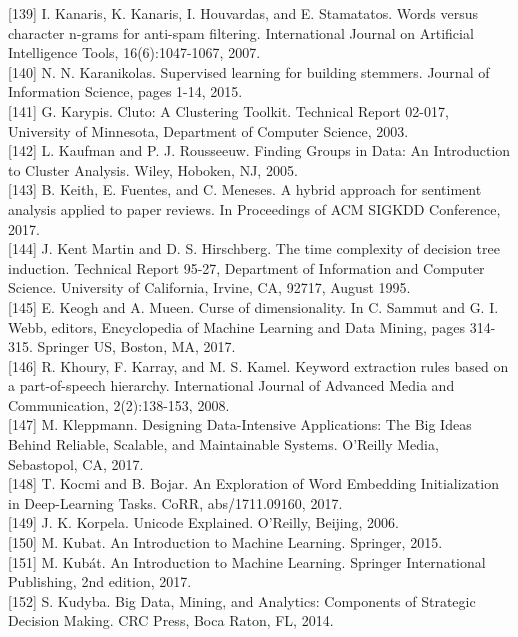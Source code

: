 \documentclass[10pt]{book}
\begin{document}
[139] I. Kanaris, K. Kanaris, I. Houvardas, and E. Stamatatos. Words versus character n-grams for anti-spam filtering. International Journal on Artificial Intelligence Tools, 16(6):1047-1067, 2007.\\[0pt]
[140] N. N. Karanikolas. Supervised learning for building stemmers. Journal of Information Science, pages 1-14, 2015.\\[0pt]
[141] G. Karypis. Cluto: A Clustering Toolkit. Technical Report 02-017, University of Minnesota, Department of Computer Science, 2003.\\[0pt]
[142] L. Kaufman and P. J. Rousseeuw. Finding Groups in Data: An Introduction to Cluster Analysis. Wiley, Hoboken, NJ, 2005.\\[0pt]
[143] B. Keith, E. Fuentes, and C. Meneses. A hybrid approach for sentiment analysis applied to paper reviews. In Proceedings of ACM SIGKDD Conference, 2017.\\[0pt]
[144] J. Kent Martin and D. S. Hirschberg. The time complexity of decision tree induction. Technical Report 95-27, Department of Information and Computer Science. University of California, Irvine, CA, 92717, August 1995.\\[0pt]
[145] E. Keogh and A. Mueen. Curse of dimensionality. In C. Sammut and G. I. Webb, editors, Encyclopedia of Machine Learning and Data Mining, pages 314-315. Springer US, Boston, MA, 2017.\\[0pt]
[146] R. Khoury, F. Karray, and M. S. Kamel. Keyword extraction rules based on a part-of-speech hierarchy. International Journal of Advanced Media and Communication, 2(2):138-153, 2008.\\[0pt]
[147] M. Kleppmann. Designing Data-Intensive Applications: The Big Ideas Behind Reliable, Scalable, and Maintainable Systems. O'Reilly Media, Sebastopol, CA, 2017.\\[0pt]
[148] T. Kocmi and B. Bojar. An Exploration of Word Embedding Initialization in Deep-Learning Tasks. CoRR, abs/1711.09160, 2017.\\[0pt]
[149] J. K. Korpela. Unicode Explained. O'Reilly, Beijing, 2006.\\[0pt]
[150] M. Kubat. An Introduction to Machine Learning. Springer, 2015.\\[0pt]
[151] M. Kubát. An Introduction to Machine Learning. Springer International Publishing, 2nd edition, 2017.\\[0pt]
[152] S. Kudyba. Big Data, Mining, and Analytics: Components of Strategic Decision Making. CRC Press, Boca Raton, FL, 2014.\\[0pt]
\end{document}
